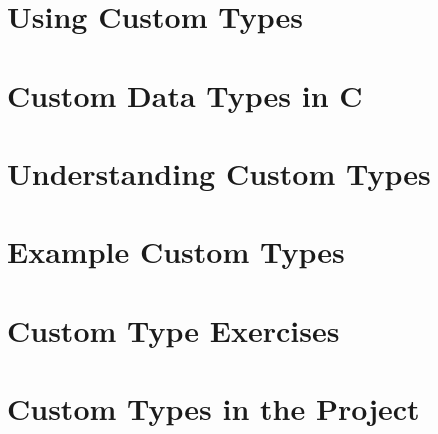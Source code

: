 
\clearpage
\section{Using Custom Types} %
\label{sec:using_custom_types}




\clearpage
\def\pageLang{c}
\section{Custom Data Types in C} %
\label{sec:custom_types_in_c}









\clearpage
\def\pageLang{none}
\section{Understanding Custom Types} %
\label{sec:understanding_custom_types}





\clearpage
\section{Example Custom Types} %
\label{sec:example_custom_types}



\clearpage
\section{Custom Type Exercises} %
\label{sec:custom_type_exercises}


\clearpage
\section{Custom Types in the Project} %
\label{sec:custom_types_in_the_project}



